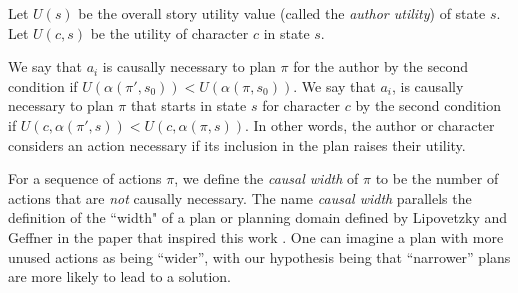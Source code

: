 \documentclass[letterpaper]{article} %
\begin{document}
Let $U(s)$ be the overall story utility value (called the \textit{author utility}) of state $s$. Let $U(c,s)$ be the utility of character $c$ in state $s$.

We say that $a_i$ is causally necessary to plan $\pi$ for the author by the second condition if $U(\alpha(\pi',s_0))<U(\alpha(\pi,s_0))$. We say that $a_i$, is causally necessary to plan $\pi$ that starts in state $s$ for character $c$ by the second condition if $U(c,\alpha(\pi',s))<U(c,\alpha(\pi,s))$. In other words, the author or character considers an action necessary if its inclusion in the plan raises their utility.

For a sequence of actions $\pi$, we define the \textit{causal width} of $\pi$ to be the number of actions that are \textit{not} causally necessary. The name \textit{causal width} parallels the definition of the ``width" of a plan or planning domain defined by Lipovetzky and Geffner in the paper that inspired this work \cite{geffner2012width}.  One can imagine a plan with more unused actions as being “wider”, with our hypothesis being that “narrower” plans are more likely to lead to a solution.



\end{document}
